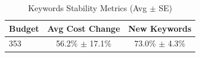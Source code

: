 \begin{table}[htbp]
\centering
\caption{Keywords Stability Metrics (Avg $\pm$ SE)}
\begin{tabular}{lcc}
\toprule
Budget & Avg Cost Change & New Keywords \\
\midrule
353 & 56.2\% $\pm$ 17.1\% & 73.0\% $\pm$ 4.3\% \\
\bottomrule
\end{tabular}
\end{table}